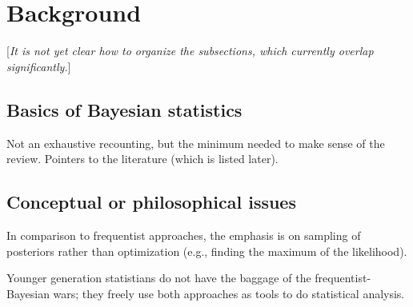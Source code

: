 \section{Background}  \label{sec:background}

[\emph{It is not yet clear how to organize the subsections, which currently overlap
  significantly.}]


\subsection{Basics of Bayesian statistics}  \label{subsec:basic_Bayes}

\bi
  \I Not an exhaustive recounting, but the minimum needed to make sense of
    the review.
  \I Pointers to the literature (which is listed later).
\ei


\subsection{Conceptual or philosophical issues} \label{subsec:conceptual_issues}

\bi
  \I In comparison to frequentist approaches, the emphasis is on sampling of posteriors
    rather than optimization (e.g., finding the maximum of the likelihood).

  \I Younger generation statistians do not have the baggage of the frequentist-Bayesian wars;
    they freely use both approaches as tools to do statistical analysis. 
\ei



